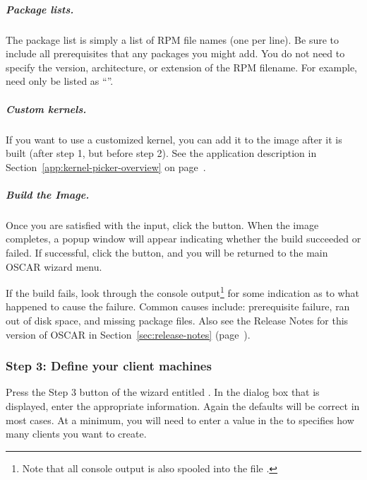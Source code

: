 \subparagraph{Package lists.}

The package list is simply a list of RPM file names (one per line). Be
sure to include all prerequisites that any packages you might add.
You do not need to specify the version, architecture, or extension of
the RPM filename.  For example,  need only
be listed as ``''.

\subparagraph{Custom kernels.}

If you want to use a customized kernel, you can add it to the image
after it is built (after step 1, but before step 2).  See the
 application description in
Section~\ref{app:kernel-picker-overview} on
page~\pageref{app:kernel-picker-overview}.

\subparagraph{Build the Image.}

Once you are satisfied with the input, click the 
button.  When the image completes, a popup window will appear
indicating whether the build succeeded or failed.  If successful,
click the  button, and you will be returned to the main
OSCAR wizard menu.

If the build fails, look through the console output\footnote{Note that
  all console output is also spooled into the file
  .} for some indication as to what happened to
cause the failure.  Common causes include: prerequisite failure, ran
out of disk space, and missing package files.  Also see the Release
Notes for this version of OSCAR in Section~\ref{sec:release-notes}
(page~\pageref{sec:release-notes}).



\subsubsection{Step 3: Define your client machines} 
\label{det:defclients}

Press the Step 3 button of the wizard entitled . In the dialog box that is displayed, enter the appropriate
information. Again the defaults will be correct in most cases. At a
minimum, you will need to enter a value in the 
to specifies how many clients you want to create.

